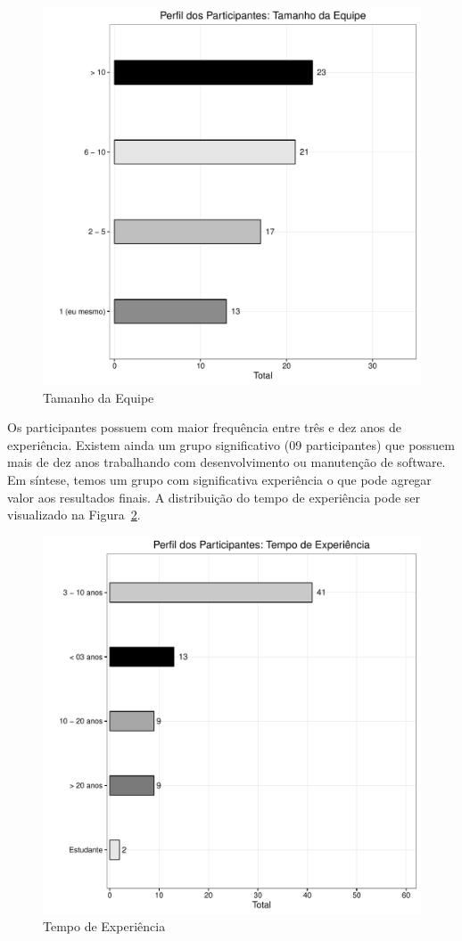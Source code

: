 \begin{figure}[htpb]
	\centering
	\includegraphics[width=0.8\linewidth]{./chapter-pesquisa-com-profissionais/img/grafico_melhorias_fgrm_tamanho_equipe.pdf}
	\caption{Tamanho da Equipe}
\label{fig:grafico_melhorias_fgrm_tamanho_equipe}
\end{figure}

Os participantes possuem com maior frequência entre três e dez anos de
experiência. Existem ainda um grupo significativo (09 participantes) que possuem
mais de dez anos trabalhando com desenvolvimento ou manutenção de software. Em
síntese, temos um grupo com significativa experiência o que pode agregar valor
aos resultados finais. A distribuição do tempo de experiência pode ser
visualizado na Figura~\ref{fig:grafico_melhorias_fgrm_tempo_experiencia}.

\begin{figure}[htpb]
	\centering
	\includegraphics[width=0.8\linewidth]{./chapter-pesquisa-com-profissionais/img/grafico_melhorias_fgrm_tempo_experiencia.pdf}
	\caption{Tempo de Experiência}
\label{fig:grafico_melhorias_fgrm_tempo_experiencia}
\end{figure}

